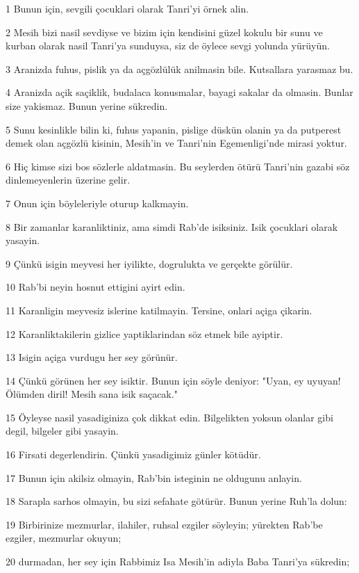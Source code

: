 \par 1 Bunun için, sevgili çocuklari olarak Tanri'yi örnek alin.
\par 2 Mesih bizi nasil sevdiyse ve bizim için kendisini güzel kokulu bir sunu ve kurban olarak nasil Tanri'ya sunduysa, siz de öylece sevgi yolunda yürüyün.
\par 3 Aranizda fuhus, pislik ya da açgözlülük anilmasin bile. Kutsallara yarasmaz bu.
\par 4 Aranizda açik saçiklik, budalaca konusmalar, bayagi sakalar da olmasin. Bunlar size yakismaz. Bunun yerine sükredin.
\par 5 Sunu kesinlikle bilin ki, fuhus yapanin, pislige düskün olanin ya da putperest demek olan açgözlü kisinin, Mesih'in ve Tanri'nin Egemenligi'nde mirasi yoktur.
\par 6 Hiç kimse sizi bos sözlerle aldatmasin. Bu seylerden ötürü Tanri'nin gazabi söz dinlemeyenlerin üzerine gelir.
\par 7 Onun için böyleleriyle oturup kalkmayin.
\par 8 Bir zamanlar karanliktiniz, ama simdi Rab'de isiksiniz. Isik çocuklari olarak yasayin.
\par 9 Çünkü isigin meyvesi her iyilikte, dogrulukta ve gerçekte görülür.
\par 10 Rab'bi neyin hosnut ettigini ayirt edin.
\par 11 Karanligin meyvesiz islerine katilmayin. Tersine, onlari açiga çikarin.
\par 12 Karanliktakilerin gizlice yaptiklarindan söz etmek bile ayiptir.
\par 13 Isigin açiga vurdugu her sey görünür.
\par 14 Çünkü görünen her sey isiktir. Bunun için söyle deniyor: "Uyan, ey uyuyan! Ölümden diril! Mesih sana isik saçacak."
\par 15 Öyleyse nasil yasadiginiza çok dikkat edin. Bilgelikten yoksun olanlar gibi degil, bilgeler gibi yasayin.
\par 16 Firsati degerlendirin. Çünkü yasadigimiz günler kötüdür.
\par 17 Bunun için akilsiz olmayin, Rab'bin isteginin ne oldugunu anlayin.
\par 18 Sarapla sarhos olmayin, bu sizi sefahate götürür. Bunun yerine Ruh'la dolun:
\par 19 Birbirinize mezmurlar, ilahiler, ruhsal ezgiler söyleyin; yürekten Rab'be ezgiler, mezmurlar okuyun;
\par 20 durmadan, her sey için Rabbimiz Isa Mesih'in adiyla Baba Tanri'ya sükredin;
